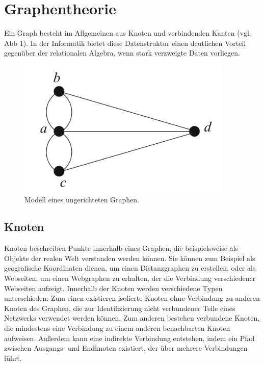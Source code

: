 \section{Graphentheorie} %
\label{sec:graphentheorie}
Ein Graph besteht im Allgemeinen aus Knoten und verbindenden Kanten (vgl. Abb 1). In der Informatik bietet diese Datenstruktur einen deutlichen Vorteil gegenüber der relationalen Algebra, wenn stark verzweigte Daten vorliegen.  \citep{graphTheory}

\begin{figure}[h!]
	\centering
	\includegraphics[scale=1]{Illustrations/graph.png}
	\caption{Modell eines ungerichteten Graphen. \citep{graphTheory}}
\end{figure}
\newpage
\subsection{Knoten} %
\label{sec:knoten}
Knoten beschreiben Punkte innerhalb eines Graphen, die beispielsweise als Objekte der realen Welt verstanden werden können. Sie können zum Beispiel als geografische Koordinaten dienen, um einen Distanzgraphen zu erstellen, oder als Webseiten, um einen Webgraphen zu erhalten, der die Verbindung verschiedener Webseiten aufzeigt. Innerhalb der Knoten werden verschiedene Typen unterschieden: Zum einen existieren isolierte Knoten ohne Verbindung zu anderen Knoten des Graphen, die zur Identifizierung nicht verbundener Teile eines Netzwerks verwendet werden können. Zum anderen bestehen verbundene Knoten, die mindestens eine Verbindung zu einem anderen benachbarten Knoten aufweisen. Außerdem kann eine indirekte Verbindung entstehen, indem ein Pfad zwischen Ausgangs- und Endknoten existiert, der über mehrere Verbindungen führt.  \citep{graphTheory} \citep{graphapplication}

